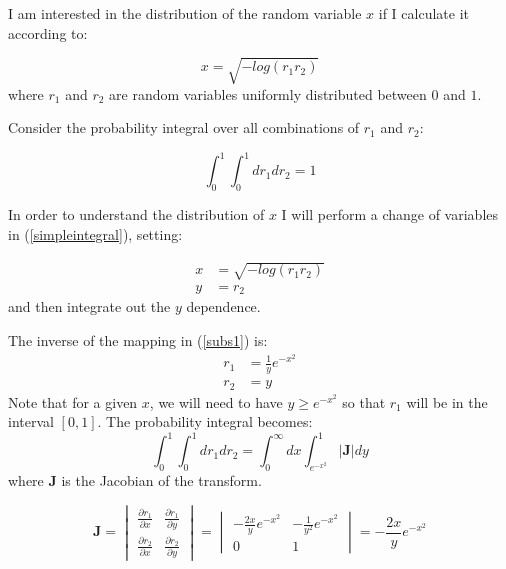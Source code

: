 \documentclass[letterpaper,12pt]{article}
\begin{document}
I am interested in the distribution of the random variable $x$ if I calculate it according to:

\begin{equation}
x = \sqrt{-log(r_1 r_2)}
\end{equation}
where $r_1$ and $r_2$ are random variables uniformly distributed between $0$ and $1$.

Consider the probability integral over all combinations of $r_1$ and $r_2$:

\begin{equation}
\label{simpleintegral}
\int_{0}^{1} \int_{0}^{1} dr_1 dr_2 = 1
\end{equation}

In order to understand the distribution of $x$ I will perform a change of variables in (\ref{simpleintegral}), setting:

\begin{equation}
\label{subs1}
\begin{aligned}
x&=\sqrt{-log(r_1 r_2)}\\
y&=r_2
\end{aligned}
\end{equation}
and then integrate out the $y$ dependence.

The inverse of the mapping in (\ref{subs1}) is:
\begin{equation}
\begin{aligned}
r_1&=\frac{1}{y}e^{-x^2}\\
r_2&=y
\end{aligned}
\end{equation}
Note that for a given $x$, we will need to have $y\ge e^{-x^2}$ so that $r_1$ will be in the interval $[0,1]$. The probability integral becomes:
\begin{equation}
\label{subs1integral}
\int_{0}^{1} \int_{0}^{1} dr_1 dr_2 = \int_{0}^{\infty}dx\int_{e^{-x^2}}^{1}|\mathbf{J}|dy
\end{equation}
where $\mathbf{J}$ is the Jacobian of the transform.

\begingroup
\renewcommand*{\arraystretch}{1.5}
\begin{equation}
\mathbf{J}=
\begin{vmatrix}
\frac{\partial r_1}{\partial x} & \frac{\partial r_1}{\partial y}\\
\frac{\partial r_2}{\partial x} & \frac{\partial r_2}{\partial y}
\end{vmatrix}
=
\begin{vmatrix}
-\frac{2 x}{y}e^{-x^2} & -\frac{1}{y^2}e^{-x^2}\\
0 & 1
\end{vmatrix}
=-\frac{2 x}{y}e^{-x^2}
\end{equation}
\endgroup
\end{document}
